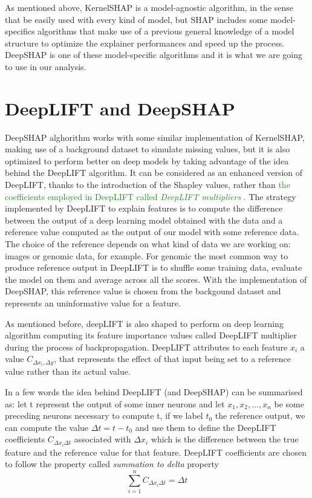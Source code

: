 \documentclass[11pt]{report}
\begin{document}

As mentioned above, KernelSHAP is a model-agnostic algorithm, in the sense that be easily used with every kind of model, but SHAP includes some model-specifics algorithms that make use of a previous general knowledge of a model structure to optimize the explainer performances and speed up the process. DeepSHAP is one of these model-specific algorithms and it is what we are going to use in our analysis.

\section{DeepLIFT and DeepSHAP}
DeepSHAP alghorithm works with some similar implementation of KernelSHAP, making use of a background dataset to simulate missing values, but it is also optimized to perform better on deep models by taking advantage of the idea behind the DeepLIFT algorithm.
It can be considered as an enhanced version of DeepLIFT, thanks to the introduction of the Shapley values, rather than \textcolor{ForestGreen}{the coefficients employed in DeepLIFT called \emph{DeepLIFT multipliers} \cite{shrikumar-2017}.
}
The strategy implemented by DeepLIFT to explain features is to compute the difference between the output of a deep learning model obtained with the   data and a reference value computed as the output of our model with some reference data.
The choice of the reference depends on what kind of data we are working on: images or genomic data, for example.
For genomic the most common way to produce reference output in DeepLIFT is to shuffle some training data, evaluate the model on them and average across all the scores.
With the implementation of DeepSHAP, this reference value is chosen from the backgound dataset and represents an uninformative value for a feature.

As mentioned before, deepLIFT is also shaped to perform on deep learning algorithm computing its feature importance values called DeepLIFT multiplier during the process of backpropagation.
DeepLIFT attributes to each feature $x_i$ a value $C_{\Delta x_i, \Delta y}$, that represents the effect of that input being set to a reference value rather than its actual value.

In a few words the idea behind DeepLIFT (and DeepSHAP) can be summarised as: let t represent the output of some inner neurons and let $x_1, x_2, ... , x_n$ be some preceding neurons necessary to compute t, if we label $t_0$ the reference output, we can compute the value $\Delta t = t-t_0$ and use them to define the DeepLIFT coefficients $C_{\Delta x_i \Delta t}$ associated with $\Delta x_i$ which is the difference between the true feature and the reference value for that feature.
DeepLIFT coefficients are chosen to follow the property called \emph{summation to delta} property
\[
\sum_{i = 1} ^n C_{\Delta x_i \Delta t} = \Delta t
\]
\end{document}
